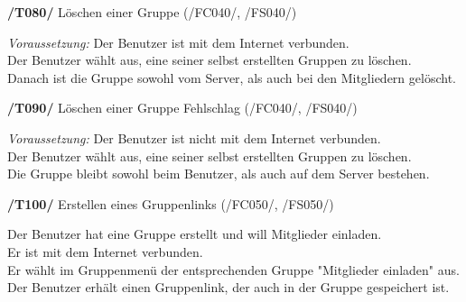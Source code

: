 \textbf{/T080/} Löschen einer Gruppe (/FC040/, /FS040/)\\
\begin{center}
\vspace{-\parskip}
\begin{minipage}[t]{0.9\textwidth}
\emph{Voraussetzung:} Der Benutzer ist mit dem Internet verbunden.                     \\
Der Benutzer wählt aus, eine seiner selbst erstellten Gruppen zu löschen.        \\
Danach ist die Gruppe sowohl vom Server, als auch bei den Mitgliedern gelöscht.   \\
\end{minipage}
\end{center}

\textbf{/T090/} Löschen einer Gruppe Fehlschlag (/FC040/, /FS040/)\\
\begin{center}
\vspace{-\parskip}
\begin{minipage}[t]{0.9\textwidth}
\emph{Voraussetzung:} Der Benutzer ist nicht mit dem Internet verbunden.                 \\
Der Benutzer wählt aus, eine seiner selbst erstellten Gruppen zu löschen.          \\
Die Gruppe bleibt sowohl beim Benutzer, als auch auf dem Server bestehen.           \\
\end{minipage}
\end{center}

\textbf{/T100/} Erstellen eines Gruppenlinks (/FC050/, /FS050/)\\
\begin{center}
\vspace{-\parskip}
\begin{minipage}[t]{0.9\textwidth}
Der Benutzer hat eine Gruppe erstellt und will Mitglieder einladen.      \\
Er ist mit dem Internet verbunden.                                        \\
Er wählt im Gruppenmenü der entsprechenden Gruppe "Mitglieder einladen" aus. \\
Der Benutzer erhält einen Gruppenlink, der auch in der Gruppe gespeichert ist.\\
\end{minipage}
\end{center}

